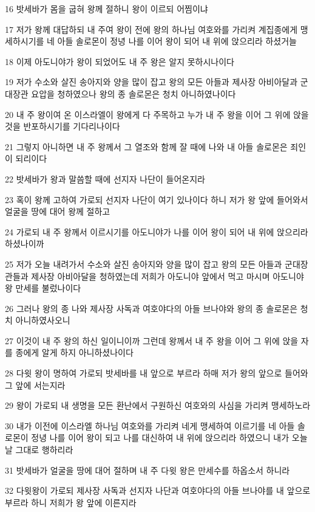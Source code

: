 \par 16 밧세바가 몸을 굽혀 왕께 절하니 왕이 이르되 어찜이냐
\par 17 저가 왕께 대답하되 내 주여 왕이 전에 왕의 하나님 여호와를 가리켜 계집종에게 맹세하시기를 네 아들 솔로몬이 정녕 나를 이어 왕이 되어 내 위에 앉으리라 하셨거늘
\par 18 이제 아도니야가 왕이 되었어도 내 주 왕은 알지 못하시나이다
\par 19 저가 수소와 살진 송아지와 양을 많이 잡고 왕의 모든 아들과 제사장 아비아달과 군대장관 요압을 청하였으나 왕의 종 솔로몬은 청치 아니하였나이다
\par 20 내 주 왕이여 온 이스라엘이 왕에게 다 주목하고 누가 내 주 왕을 이어 그 위에 앉을 것을 반포하시기를 기다리나이다
\par 21 그렇지 아니하면 내 주 왕께서 그 열조와 함께 잘 때에 나와 내 아들 솔로몬은 죄인이 되리이다
\par 22 밧세바가 왕과 말씀할 때에 선지자 나단이 들어온지라
\par 23 혹이 왕께 고하여 가로되 선지자 나단이 여기 있나이다 하니 저가 왕 앞에 들어와서 얼굴을 땅에 대어 왕께 절하고
\par 24 가로되 내 주 왕께서 이르시기를 아도니야가 나를 이어 왕이 되어 내 위에 앉으리라 하셨나이까
\par 25 저가 오늘 내려가서 수소와 살진 송아지와 양을 많이 잡고 왕의 모든 아들과 군대장관들과 제사장 아비아달을 청하였는데 저희가 아도니야 앞에서 먹고 마시며 아도니야왕 만세를 불렀나이다
\par 26 그러나 왕의 종 나와 제사장 사독과 여호야다의 아들 브나야와 왕의 종 솔로몬은 청치 아니하였사오니
\par 27 이것이 내 주 왕의 하신 일이니이까 그런데 왕께서 내 주 왕을 이어 그 위에 앉을 자를 종에게 알게 하지 아니하셨나이다
\par 28 다윗 왕이 명하여 가로되 밧세바를 내 앞으로 부르라 하매 저가 왕의 앞으로 들어와 그 앞에 서는지라
\par 29 왕이 가로되 내 생명을 모든 환난에서 구원하신 여호와의 사심을 가리켜 맹세하노라
\par 30 내가 이전에 이스라엘 하나님 여호와를 가리켜 네게 맹세하여 이르기를 네 아들 솔로몬이 정녕 나를 이어 왕이 되고 나를 대신하여 내 위에 앉으리라 하였으니 내가 오늘날 그대로 행하리라
\par 31 밧세바가 얼굴을 땅에 대어 절하며 내 주 다윗 왕은 만세수를 하옵소서 하니라
\par 32 다윗왕이 가로되 제사장 사독과 선지자 나단과 여호야다의 아들 브나야를 내 앞으로 부르라 하니 저희가 왕 앞에 이른지라
